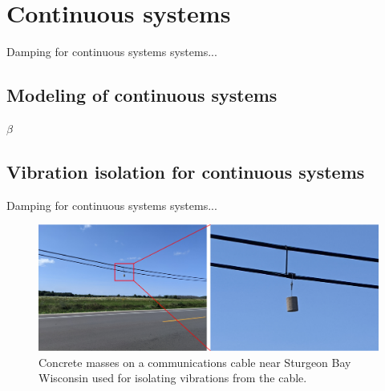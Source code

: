 \documentclass[12pt,letter]{article}
\begin{document}
	
	\setcounter{section}{5}	
	\setcounter{figure}{0}   
	\renewcommand\thefigure{\thesection.\arabic{figure}}
	\setcounter{equation}{0}   
	\renewcommand\theequation{\thesection.\arabic{equation}}

	\section{Continuous systems}

Damping for continuous systems systems...  

\subsection{Modeling of continuous systems}
	
	$\beta$


\subsection{Vibration isolation for continuous systems}

Damping for continuous systems systems...  

\begin{figure}[H]
    \centering
    \includegraphics[width=6.5in]{../figures/cable_mass}
    \caption{Concrete masses on a communications cable near Sturgeon Bay Wisconsin used for isolating vibrations from the cable.}
    \label{fig:accelerometers}
\end{figure} 
\end{document}
